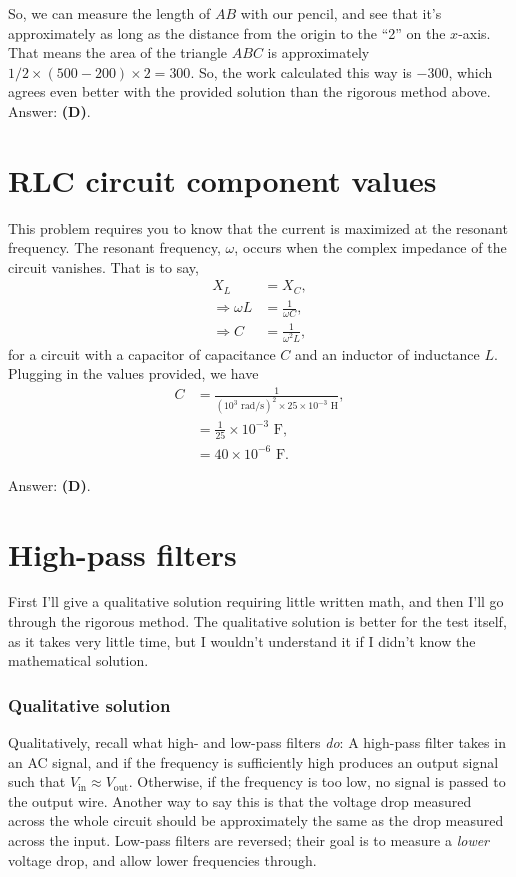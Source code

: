 \documentclass[11pt]{paper}
\newcommand{\answer}[1]{Answer: \textbf{(#1)}.}
\begin{document}
So, we can measure the length of $AB$ with our pencil, and see that it's approximately as long as the distance from the origin to the ``2'' on the $x$-axis.  That means the area of the triangle $ABC$ is approximately $1/2 \times \left(500-200\right) \times 2 = 300$.  So, the work calculated this way is $-300$, which agrees even better with the provided solution than the rigorous method above.\\

\answer{D}
\section{RLC circuit component values}
This problem requires you to know that the current is maximized at the resonant frequency.  The resonant frequency, $\omega$, occurs when the complex impedance of the circuit vanishes.  That is to say,
\begin{align}
X_L &= X_C,\\
\Rightarrow \omega L &= \frac{1}{\omega C},\\
\Rightarrow C &= \frac{1}{\omega^2 L},
\end{align}
for a circuit with a capacitor of capacitance $C$ and an inductor of inductance $L$.  Plugging in the values provided, we have
\begin{align}
C &= \frac{1}{(10^3 \text{ rad}/\text{s})^2 \times 25 \times 10^{-3} \text{ H}},\\
&= \frac{1}{25} \times 10^{-3} \text{ F},\\
&= 40 \times 10^{-6} \text{ F}.
\end{align}

\answer{D}

\section{High-pass filters}
First I'll give a qualitative solution requiring little written math, and then I'll go through the rigorous method.  The qualitative solution is better for the test itself, as it takes very little time, but I wouldn't understand it if I didn't know the mathematical solution.
\subsubsection*{Qualitative solution}
Qualitatively, recall what high- and low-pass filters \emph{do}: A high-pass filter takes in an AC signal, and if the frequency is sufficiently high produces an output signal such that $V_\text{in} \approx V_\text{out}$.  Otherwise, if the frequency is too low, no signal is passed to the output wire.  Another way to say this is that the voltage drop measured across the whole circuit should be approximately the same as the drop measured across the input.  Low-pass filters are reversed; their goal is to measure a \emph{lower} voltage drop, and allow lower frequencies through.
\end{document}
